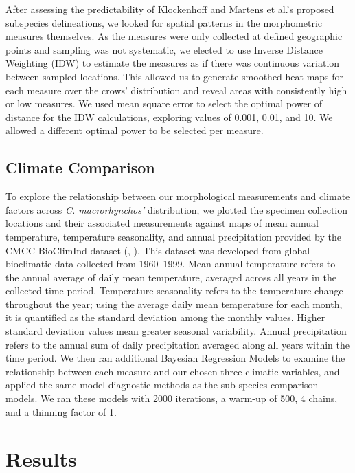 \documentclass[10pt,a4paper]{article}
\begin{document}
After assessing the predictability of Klockenhoff and Martens et al.'s proposed subspecies delineations, we looked for spatial patterns in the morphometric measures themselves.
As the measures were only collected at defined geographic points and sampling was not systematic, we elected to use Inverse Distance Weighting (IDW) to estimate the measures as if there was continuous variation between sampled locations.
This allowed us to generate smoothed heat maps for each measure over the crows' distribution and reveal areas with consistently high or low measures.
We used mean square error to select the optimal power of distance for the IDW calculations, exploring values of 0.001, 0.01, and 10.
We allowed a different optimal power to be selected per measure.

\subsection{Climate Comparison}\label{climate-comparison}

To explore the relationship between our morphological measurements and climate factors across \emph{C. macrorhynchos'} distribution, we plotted the specimen collection locations and their associated measurements against maps of mean annual temperature, temperature seasonality, and annual precipitation provided by the CMCC-BioClimInd dataset (, ).
This dataset was developed from global bioclimatic data collected from 1960--1999.
Mean annual temperature refers to the annual average of daily mean temperature, averaged across all years in the collected time period.
Temperature seasonality refers to the temperature change throughout the year; using the average daily mean temperature for each month, it is quantified as the standard deviation among the monthly values.
Higher standard deviation values mean greater seasonal variability.
Annual precipitation refers to the annual sum of daily precipitation averaged along all years within the time period.
We then ran additional Bayesian Regression Models to examine the relationship between each measure and our chosen three climatic variables, and applied the same model diagnostic methods as the sub-species comparison models.
We ran these models with 2000 iterations, a warm-up of 500, 4 chains, and a thinning factor of 1.

\section{Results}\label{results}
\end{document}
